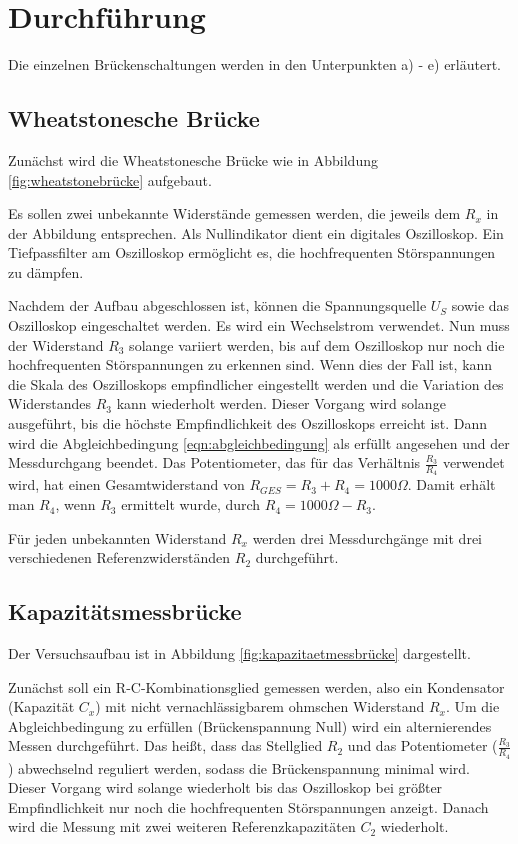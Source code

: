 \section{Durchführung}
\label{sec:Durchführung}

Die einzelnen Brückenschaltungen werden in den Unterpunkten a) - e) erläutert.

\subsection{Wheatstonesche Brücke}
\label{sec:durcha}
Zunächst wird die Wheatstonesche Brücke wie in Abbildung \ref{fig:wheatstonebrücke} aufgebaut.

Es sollen zwei unbekannte Widerstände gemessen werden, die jeweils dem $R_x$ in der Abbildung entsprechen.
Als Nullindikator dient ein digitales Oszilloskop.
Ein Tiefpassfilter am Oszilloskop ermöglicht es, die hochfrequenten Störspannungen zu dämpfen.

Nachdem der Aufbau abgeschlossen ist, können die Spannungsquelle $U_S$ sowie das Oszilloskop eingeschaltet werden.
Es wird ein Wechselstrom verwendet.
Nun muss der Widerstand $R_3$ solange variiert werden, bis auf dem Oszilloskop nur noch die hochfrequenten Störspannungen zu erkennen sind.
Wenn dies der Fall ist, kann die Skala des Oszilloskops empfindlicher eingestellt werden und
die Variation des Widerstandes $R_3$ kann wiederholt werden.
Dieser Vorgang wird solange ausgeführt, bis die höchste Empfindlichkeit des Oszilloskops erreicht ist.
Dann wird die Abgleichbedingung \eqref{eqn:abgleichbedingung} als erfüllt angesehen und der Messdurchgang beendet.
Das Potentiometer, das für das Verhältnis $\frac{R_3}{R_4}$ verwendet wird, hat einen Gesamtwiderstand von $R_{GES} = R_3 + R_4 = 1000 \Omega$.
Damit erhält man $R_4$, wenn $R_3$ ermittelt wurde, durch $R_4 = 1000 \Omega - R_3$.

Für jeden unbekannten Widerstand $R_x$ werden drei Messdurchgänge mit drei verschiedenen Referenzwiderständen $R_2$ durchgeführt.

\subsection{Kapazitätsmessbrücke}
\label{sec:durchb}
Der Versuchsaufbau ist in Abbildung \ref{fig:kapazitaetmessbrücke} dargestellt.

Zunächst soll ein R-C-Kombinationsglied gemessen werden, also ein Kondensator (Kapazität $C_x$) mit nicht vernachlässigbarem ohmschen Widerstand $R_x$.
Um die Abgleichbedingung zu erfüllen (Brückenspannung Null) wird ein alternierendes Messen durchgeführt. %
Das heißt, dass das Stellglied $R_2$ und das Potentiometer ($\frac{R_3}{R_4}$) abwechselnd reguliert werden, sodass die Brückenspannung minimal wird.
Dieser Vorgang wird solange wiederholt bis das Oszilloskop bei größter Empfindlichkeit nur noch die hochfrequenten Störspannungen anzeigt.
Danach wird die Messung mit zwei weiteren Referenzkapazitäten $C_2$ wiederholt.

